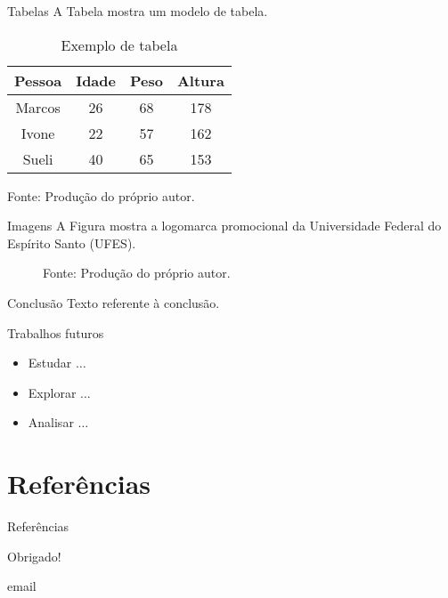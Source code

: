 \documentclass[11pt]{beamer}
\newcommand{\email}{email}
\begin{document}
\begin{frame}{Tabelas}
    A Tabela mostra um modelo de tabela.

    \begin{table}[htb]
        \caption{Exemplo de tabela}
        \label{tab:modelo_tabela}
        \centering
        \begin{tabular}{c|c|c|c}
	        \hline
	        \textbf{Pessoa} & \textbf{Idade} & \textbf{Peso} & \textbf{Altura} \\ \hline
	        Marcos & 26    & 68   & 178    \\ \hline
	        Ivone  & 22    & 57   & 162    \\ \hline
	        Sueli  & 40    & 65   & 153    \\ \hline
        \end{tabular}
        
        \medskip
        
        Fonte: Produção do próprio autor.
    \end{table}
\end{frame}

\begin{frame}{Imagens}
    A Figura mostra a logomarca promocional da Universidade Federal do Espírito Santo (UFES).
    
    \begin{figure}[htb]
      
        
        \medskip
        
        Fonte: Produção do próprio autor.
    \end{figure}
\end{frame}

\begin{frame}{Conclusão}
    Texto referente à conclusão.
\end{frame}

\begin{frame}{Trabalhos futuros}
    \begin{itemize}
        \item Estudar $\ldots$
        
        \medskip
        
        \item Explorar $\ldots$
        
        \medskip
        
        \item Analisar $\ldots$
    \end{itemize}
\end{frame}

\section{Referências}
\begin{frame}{Referências}
    
\end{frame}

\begin{frame}

\begin{center}
    Obrigado!
    
    \email
\end{center}

\begin{figure}[htb]
    \centering

\end{figure}

\end{frame}
\end{document}
